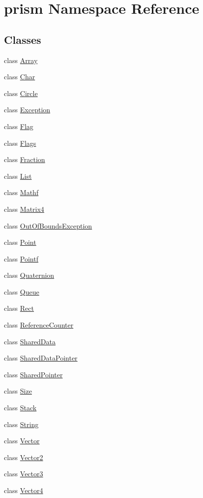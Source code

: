 \hypertarget{namespaceprism}{}\section{prism Namespace Reference}
\label{namespaceprism}
\subsection*{Classes}
\begin{DoxyCompactItemize}
\item 
class \hyperlink{classprism_1_1_array}{Array}
\item 
class \hyperlink{classprism_1_1_char}{Char}
\item 
class \hyperlink{classprism_1_1_circle}{Circle}
\item 
class \hyperlink{classprism_1_1_exception}{Exception}
\item 
class \hyperlink{classprism_1_1_flag}{Flag}
\item 
class \hyperlink{classprism_1_1_flags}{Flags}
\item 
class \hyperlink{classprism_1_1_fraction}{Fraction}
\item 
class \hyperlink{classprism_1_1_list}{List}
\item 
class \hyperlink{classprism_1_1_mathf}{Mathf}
\item 
class \hyperlink{classprism_1_1_matrix4}{Matrix4}
\item 
class \hyperlink{classprism_1_1_out_of_bounds_exception}{Out\+Of\+Bounds\+Exception}
\item 
class \hyperlink{classprism_1_1_point}{Point}
\item 
class \hyperlink{classprism_1_1_pointf}{Pointf}
\item 
class \hyperlink{classprism_1_1_quaternion}{Quaternion}
\item 
class \hyperlink{classprism_1_1_queue}{Queue}
\item 
class \hyperlink{classprism_1_1_rect}{Rect}
\item 
class \hyperlink{classprism_1_1_reference_counter}{Reference\+Counter}
\item 
class \hyperlink{classprism_1_1_shared_data}{Shared\+Data}
\item 
class \hyperlink{classprism_1_1_shared_data_pointer}{Shared\+Data\+Pointer}
\item 
class \hyperlink{classprism_1_1_shared_pointer}{Shared\+Pointer}
\item 
class \hyperlink{classprism_1_1_size}{Size}
\item 
class \hyperlink{classprism_1_1_stack}{Stack}
\item 
class \hyperlink{classprism_1_1_string}{String}
\item 
class \hyperlink{classprism_1_1_vector}{Vector}
\item 
class \hyperlink{classprism_1_1_vector2}{Vector2}
\item 
class \hyperlink{classprism_1_1_vector3}{Vector3}
\item 
class \hyperlink{classprism_1_1_vector4}{Vector4}
\end{DoxyCompactItemize}
